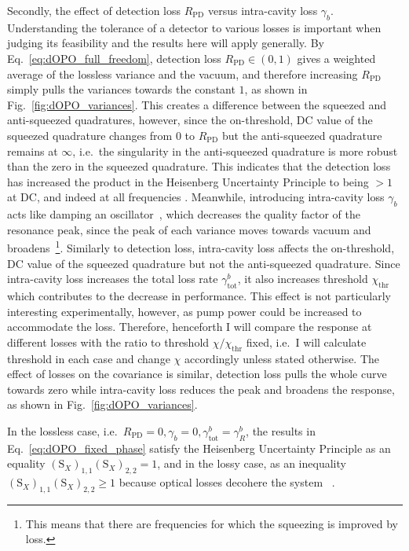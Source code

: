 Secondly, the effect of detection loss $R_\text{PD}$ versus intra-cavity loss $\gamma_b$. Understanding the tolerance of a detector to various losses is important when judging its feasibility and the results here will apply generally. By Eq.~\ref{eq:dOPO_full_freedom}, detection loss $R_\text{PD}\in(0,1)$ gives a weighted average of the lossless variance and the vacuum, and therefore increasing $R_\text{PD}$ simply pulls the variances towards the constant $1$, as shown in Fig.~\ref{fig:dOPO_variances}. This creates a difference between the squeezed and anti-squeezed quadratures, however, since the on-threshold, DC value of the squeezed quadrature changes from $0$ to $R_\text{PD}$ but the anti-squeezed quadrature remains at $\infty$, i.e.\ the singularity in the anti-squeezed quadrature is more robust than the zero in the squeezed quadrature. This indicates that the detection loss has increased the product in the Heisenberg Uncertainty Principle to being $>1$ at DC, and indeed at all frequencies . Meanwhile, introducing intra-cavity loss $\gamma_b$ acts like damping an oscillator~\cite{}, which decreases the quality factor of the resonance peak, since the peak of each variance moves towards vacuum and broadens~\footnote{This means that there are frequencies for which the squeezing is improved by loss.}. Similarly to detection loss, intra-cavity loss affects the on-threshold, DC value of the squeezed quadrature but not the anti-squeezed quadrature. Since intra-cavity loss increases the total loss rate $\gamma^b_\text{tot}$, it also increases threshold $\chi_\text{thr}$ which contributes to the decrease in performance. This effect is not particularly interesting experimentally, however, as pump power could be increased to accommodate the loss. Therefore, henceforth I will compare the response at different losses with the ratio to threshold $\chi/\chi_\text{thr}$ fixed, i.e.\ I will calculate threshold in each case and change $\chi$ accordingly unless stated otherwise. 
The effect of losses on the covariance is similar, detection loss pulls the whole curve towards zero while intra-cavity loss reduces the peak and broadens the response, as shown in Fig.~\ref{fig:dOPO_variances}.


In the lossless case, i.e.\ $R_\text{PD}=0, \gamma_b=0, \gamma^b_\text{tot}=\gamma^b_R$, the results in Eq.~\ref{eq:dOPO_fixed_phase} satisfy the Heisenberg Uncertainty Principle as an equality  $(\text{S}_X)_{1,1}(\text{S}_X)_{2,2}=1$, and in the lossy case, as an inequality $(\text{S}_X)_{1,1}(\text{S}_X)_{2,2}\geq1$ because optical losses decohere the system~\cite{} .


